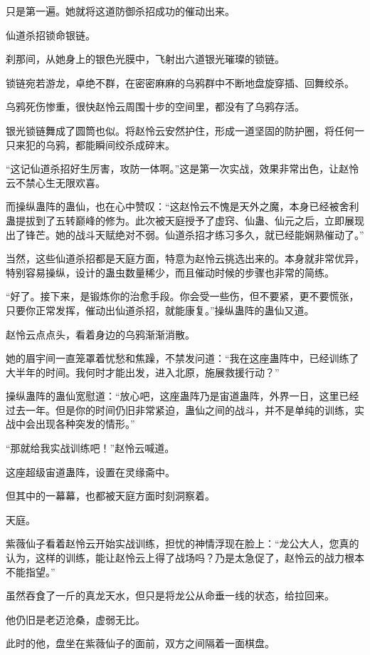 \begin{this_body}
只是第一遍。她就将这道防御杀招成功的催动出来。

仙道杀招锁命银链。

刹那间，从她身上的银色光膜中，飞射出六道银光璀璨的锁链。

锁链宛若游龙，卓绝不群，在密密麻麻的乌鸦群中不断地盘旋穿插、回舞绞杀。

乌鸦死伤惨重，很快赵怜云周围十步的空间里，都没有了乌鸦存活。

银光锁链舞成了圆筒也似。将赵怜云安然护住，形成一道坚固的防护圈，将任何一只来犯的乌鸦，都能瞬间绞杀成碎末。

“这记仙道杀招好生厉害，攻防一体啊。”这是第一次实战，效果非常出色，让赵怜云不禁心生无限欢喜。

而操纵蛊阵的蛊仙，也在心中赞叹：“这赵怜云不愧是天外之魔，本身已经被舍利蛊提拔到了五转巅峰的修为。此次被天庭授予了虚窍、仙蛊、仙元之后，立即展现出了锋芒。她的战斗天赋绝对不弱。仙道杀招才练习多久，就已经能娴熟催动了。”

当然，这些仙道杀招都是天庭方面，特意为赵怜云挑选出来的。本身就非常优异，特别容易操纵，设计的蛊虫数量稀少，而且催动时候的步骤也非常的简练。

“好了。接下来，是锻炼你的治愈手段。你会受一些伤，但不要紧，更不要慌张，只要你正常发挥，催动出仙道杀招，就能康复。”操纵蛊阵的蛊仙又道。

赵怜云点点头，看着身边的乌鸦渐渐消散。

她的眉宇间一直笼罩着忧愁和焦躁，不禁发问道：“我在这座蛊阵中，已经训练了大半年的时间。我何时才能出发，进入北原，施展救援行动？”

操纵蛊阵的蛊仙宽慰道：“放心吧，这座蛊阵乃是宙道蛊阵，外界一日，这里已经过去一年。但是你的时间仍旧非常紧迫，蛊仙之间的战斗，并不是单纯的训练，实战中会出现各种突发的情形。”

“那就给我实战训练吧！”赵怜云喊道。

这座超级宙道蛊阵，设置在灵缘斋中。

但其中的一幕幕，也都被天庭方面时刻洞察着。

天庭。

紫薇仙子看着赵怜云开始实战训练，担忧的神情浮现在脸上：“龙公大人，您真的认为，这样的训练，能让赵怜云上得了战场吗？乃是太急促了，赵怜云的战力根本不能指望。”

虽然吞食了一斤的真龙天水，但只是将龙公从命垂一线的状态，给拉回来。

他仍旧是老迈沧桑，虚弱无比。

此时的他，盘坐在紫薇仙子的面前，双方之间隔着一面棋盘。


\end{this_body}
